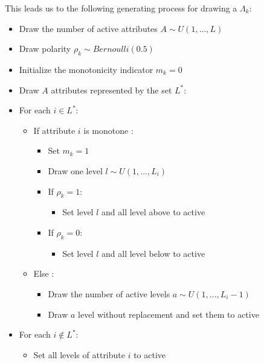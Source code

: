 \documentclass[12pt]{article}
\begin{document}
This leads us to the following generating process for drawing a $\Lambda_k$:
\begin{itemize}
	\item Draw the number of active attributes $A \sim U(1,...,L)$
	\item Draw polarity $\rho_k \sim Bernoulli(0.5)$
	\item Initialize the monotonicity indicator $m_k = 0$
	\item Draw $A$ attributes represented by the set $L^*$: 
	\item For each $i \in L^*$:
	\begin{itemize}
		\item If attribute $i$ is monotone :
		\begin{itemize}
			\item Set $m_k = 1$
			\item Draw one level $l \sim U(1,...,L_i)$
			\item If $\rho_k = 1$:
			\begin{itemize}
				\item Set level $l$ and all level above to active
			\end{itemize}
			\item If $\rho_k = 0$:
			\begin{itemize}
				\item Set level $l$ and all level below to active
			\end{itemize}
		\end{itemize}
		\item Else :
		\begin{itemize}
			\item Draw the number of active levels $a \sim U(1,...,L_i-1)$
			\item Draw $a$ level without replacement and set them to active
		\end{itemize}
	\end{itemize}
	\item For each $i \notin L^*$:
	\begin{itemize}
		\item Set all levels of attribute $i$ to active
	\end{itemize}
\end{itemize}
\end{document}
